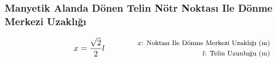 \subsubsection*{Manyetik Alanda Dönen Telin Nötr Noktası Ile Dönme Merkezi Uzaklığı}
\begin{equation}
    x = \frac{\sqrt{2}}{2} l \qquad \qquad \parbox{4cm}{\footnotesize$\begin{aligned}
        x\text{: Noktası Ile Dönme Merkezi Uzaklığı (m) } \\
        l\text{: Telin Uzunluğu (m) }
\end{aligned}$}
\end{equation}
